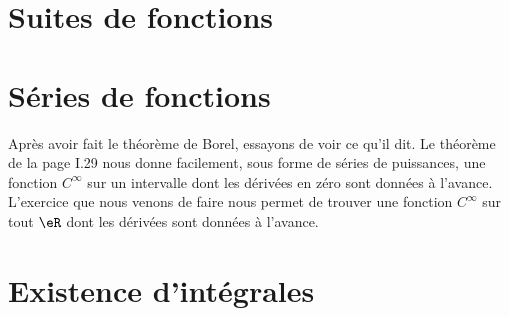 
					\section{Suites de fonctions}


					\section{Séries de fonctions}


Après avoir fait le théorème de Borel, essayons de voir ce qu'il dit. Le théorème de la page I.29 nous donne facilement, sous forme de séries de puissances, une fonction $ C^{\infty}$ sur un intervalle dont les dérivées en zéro sont données à l'avance. L'exercice que nous venons de faire nous permet de trouver une fonction $ C^{\infty}$ sur tout $\eR$ dont les dérivées sont données à l'avance.


					\section{Existence d'intégrales}

